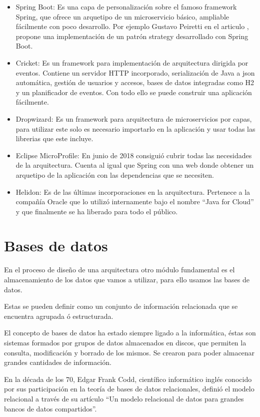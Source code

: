 \documentclass[12pt]{report} %
\begin{document}
 \begin{itemize}
 	\item Spring Boot: Es una capa de personalización sobre el famoso framework Spring, que ofrece un arquetipo de un microservicio básico, ampliable fácilmente con poco desarrollo. Por ejemplo Gustavo Peiretti en el articulo \cite{StrategySpringBoot}, propone una implementación de un patrón strategy desarrollado con Spring Boot.
 	\item Cricket: Es un framework para implementación de arquitectura dirigida por eventos. Contiene un servidor HTTP incorporado, serialización de Java a json automática, gestión de usuarios y accesos, bases de datos integradas como H2 y un planificador de eventos. Con todo ello se puede construir una aplicación fácilmente.
 	\item Dropwizard: Es un framework para arquitectura de microservicios por capas, para utilizar este solo es necesario importarlo en la aplicación y usar todas las librerias que este incluye.
 	\item Eclipse MicroProfile: En junio de 2018 consiguió cubrir todas las necesidades de la arquitectura. Cuenta al igual que Spring con una web donde obtener un arquetipo de la aplicación con las dependencias que se necesiten.
 	\item Helidon: Es de las últimas incorporaciones en la arquitectura. Pertenece a la compañía Oracle que lo utilizó internamente bajo el nombre “Java for Cloud” y que finalmente se ha liberado para todo el público. 
 \end{itemize}
	
	\section{Bases de datos}
	En el proceso de diseño de una arquitectura otro módulo fundamental es el almacenamiento de los datos que vamos a utilizar, para ello usamos las bases de datos.

	Estas se pueden definir como un conjunto de información relacionada que se encuentra agrupada ó estructurada.
	
	El concepto de bases de datos ha estado siempre ligado a la informática, éstas son sistemas formados por grupos de datos almacenados en discos, que permiten la consulta, modificación y borrado de los mismos. Se crearon para poder almacenar grandes cantidades de información. 
	
	En la década de los 70, Edgar Frank Codd, científico informático inglés conocido por sus participación en la teoría de bases de datos relacionales, definió el modelo relacional  a través de su artículo “Un modelo relacional de datos para grandes bancos de datos compartidos”\cite{RelationalModel}.
	
\end{document}
